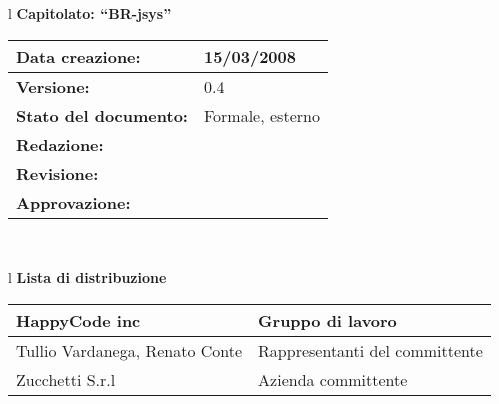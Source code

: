 

\newcommand{\lv}{ 0.4 } %
\newcommand{\dt}{ Modifiche ai documenti }%
\newcommand{\Grammatica}{} %

\begin{center}
\thispagestyle{plain}
\begin{table}[htbp]
\large{
\begin{tabular}{l}
\Large{\textbf{\textsf{Capitolato: ``BR-jsys''}}} \\
\begin{tabular}{|p{6cm}|p{6cm}|} \hline
\textbf{Data creazione:} & 15/03/2008 \\ \hline
\textbf{Versione:} & \lv \\ \hline
\textbf{Stato del documento:} & Formale, esterno \\ \hline
\textbf{Redazione:} &  \AT \\ \hline
\textbf{Revisione:} & \MT \\ \hline
\textbf{Approvazione:} & \MM \\ \hline
\end{tabular} \\
\end{tabular}
}
\end{table}

\begin{table}[hbtp]
\large{
\begin{tabular}{l}
\Large{\textbf{\textsf{Lista di distribuzione}}} \\

\begin{tabular}{|p{6cm}|p{6cm}|} \hline
{HappyCode inc}& Gruppo di lavoro\\ \hline
{Tullio Vardanega, Renato Conte}& Rappresentanti del committente \\ \hline
{Zucchetti S.r.l}& Azienda committente\\ \hline
\end{tabular} \\
\end{tabular}
}
\end{table}
\begin{table}[hbtp]


\end{table}
\end{center}
